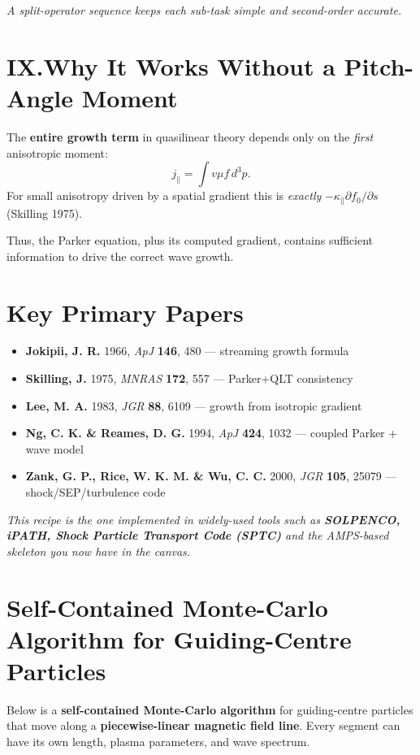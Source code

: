 \noindent
\textit{A split-operator sequence keeps each sub-task simple and second-order accurate.}

\section*{IX.\quad Why It Works Without a Pitch-Angle Moment}

\noindent
The \textbf{entire growth term} in quasilinear theory depends only on the \textit{first} anisotropic moment:
\[
j_\parallel = \int v \mu f\, d^3p.
\]
For small anisotropy driven by a spatial gradient this is \textit{exactly} $-\kappa_\parallel \partial f_0 / \partial s$ (Skilling 1975).

\noindent
Thus, the Parker equation, plus its computed gradient, contains sufficient information to drive the correct wave growth.

\section*{Key Primary Papers}

\begin{itemize}
\item \textbf{Jokipii, J. R.} 1966, \textit{ApJ} \textbf{146}, 480 — streaming growth formula
\item \textbf{Skilling, J.} 1975, \textit{MNRAS} \textbf{172}, 557 — Parker+QLT consistency
\item \textbf{Lee, M. A.} 1983, \textit{JGR} \textbf{88}, 6109 — growth from isotropic gradient
\item \textbf{Ng, C. K. \& Reames, D. G.} 1994, \textit{ApJ} \textbf{424}, 1032 — coupled Parker + wave model
\item \textbf{Zank, G. P., Rice, W. K. M. \& Wu, C. C.} 2000, \textit{JGR} \textbf{105}, 25079 — shock/SEP/turbulence code
\end{itemize}

\noindent
\textit{This recipe is the one implemented in widely-used tools such as \textbf{SOLPENCO, iPATH, Shock Particle Transport Code (SPTC)} and the AMPS-based skeleton you now have in the canvas.}

\section*{Self-Contained Monte-Carlo Algorithm for Guiding-Centre Particles}

\noindent
Below is a \textbf{self-contained Monte-Carlo algorithm} for guiding-centre particles that move along a \textbf{piecewise-linear magnetic field line}. Every segment can have its own length, plasma parameters, and wave spectrum.

